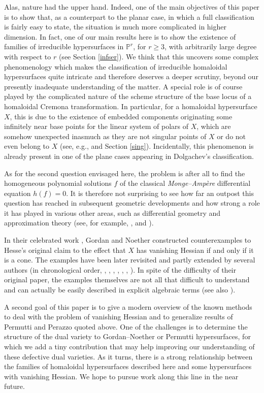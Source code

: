 \documentclass[11pt]{article}   %
\theoremstyle{definition}
\numberwithin{Theorem}{section} \numberwithin{equation}{section}
\newcommand{\p}{{\mathbb P}}
\begin{document}
Alas, nature had the upper hand.  Indeed, one of the main objectives
of this paper is to show that, as a counterpart to the planar case,
in which a full classification is  {
fairly} easy to state, the situation is
much more complicated in higher dimension. In fact, one of our main
results here is to show the existence of families of irreducible
hypersurfaces in $\p^ r$, for $r\geq 3$, with arbitrarily large
degree with respect to $r$ (see {Section} \ref {infser}).
{We think that this uncovers} some complex
phenomenology which makes  the
classification of irreducible homaloidal hypersurfaces quite
intricate and therefore deserves a deeper
scrutiny, { beyond} our presently {inadequate}
understanding of the matter. A special role is of course
played by the complicated nature of the scheme structure of the base
locus of a homaloidal Cremona transformation. In particular, for a
homaloidal hypersurface $X$, this is due to the existence of
embedded components originating some infinitely near base points for
the linear system of polars of $X$, which are somehow unexpected
inasmuch as they are not singular points of $X$ or do not
 even belong to $X$ (see, e.g.,
\cite{Aluffi} and  {Section} \ref{sing}). {Incidentally,
this phenomenon is already present}
in one of the plane cases appearing in Dolgachev's
classification.

As for the second question envisaged here,
the problem {is after all} to find the
homogeneous polynomial solutions $f$ of the classical \emph
{Monge--Amp\`ere} differential equation $h(f)=0$. It is therefore
not surprising to see how far {an
outpost} this question has reached in subsequent geometric
developments and how strong a role it has played in various other
areas, such as differential geometry and approximation theory (see,
for example, \cite{Segrediff}, \cite{FW} and \cite{control}).

{In their celebrated work  \cite{GN},
Gordan and Noether constructed counterexamples}
to Hesse's original claim to the effect that $X$ has
vanishing Hessian if and only if it is a
cone. The examples have been later revisited and partly
extended by several authors (in chronological order,
\cite{hessianoSegre}, \cite{Fr1},
\cite{Fr2}, \cite{Permutti1}, \cite{Permutti2}, \cite{Permutti3},
\cite{Lossen}). {In spite of the difficulty of their original
paper, the examples themselves} are not {all that} difficult to understand
 and  {can actually} be
easily described in explicit algebraic terms (see also
\cite{Perazzo}).

A second goal of this paper is to give a modern overview of the
known methods to deal with the problem of vanishing Hessian and to
generalize results of Permutti and Perazzo { quoted}
 above. One of the challenges is to
determine the structure of the dual variety to Gordan--Noether or
Permutti hypersurfaces, for which we add a tiny contribution that
may help improving our understanding of these defective dual
varieties. { As it turns,}  there is a strong relationship between {the}
 families of homaloidal
hypersurfaces {described here} and some hypersurfaces with
vanishing Hessian. {We hope to pursue work along this line in the near future}.
\end{document}
